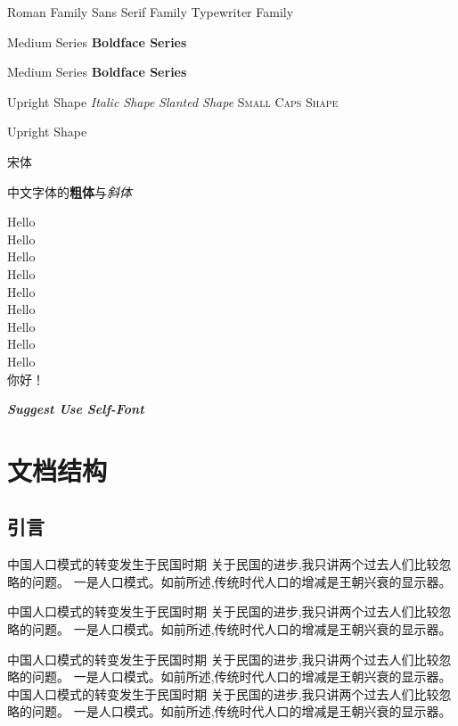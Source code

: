 \documentclass{article} %
\newcommand{\myfont}{\itshape\bfseries\sffamily} %
\begin{document}
	\rmfamily Roman Family {\sffamily Sans Serif Family} {\ttfamily Typewriter Family} 

	
	\textmd{Medium Series} \textbf{Boldface Series}
	
	{\mdseries Medium Series} {\bfseries Boldface Series}
	
	\textup{Upright Shape} \quad \textit{Italic Shape} \quad \textsl{Slanted Shape} \quad \textsc{Small Caps Shape}
	
	{\upshape Upright Shape}   
	
	
	
	{\songti 宋体}    
	
	中文字体的\textbf{粗体}与\textit{斜体}

	{\tiny  Hello}\\
	{\scriptsize  Hello}\\
	{\footnotesize  Hello}\\
	{\small  Hello}\\
	{\normalsize  Hello}\\
	{\large  Hello}\\
	{\LARGE  Hello}\\
	{\huge  Hello}\\
	{\Huge  Hello}\\
	
	{ 你好！} %
	
	
	
	{\myfont Suggest Use Self-Font}
	
	
	\section{文档结构}
	\subsection{引言}
	中国人口模式的转变发生于民国时期 关于民国的进步,我只讲两个过去人们比较忽略的问题。	一是人口模式。如前所述,传统时代人口的增减是王朝兴衰的显示器。
	
	中国人口模式的转变发生于民国时期 关于民国的进步,我只讲两个过去人们比较忽略的问题。	一是人口模式。如前所述,传统时代人口的增减是王朝兴衰的显示器。\par
	中国人口模式的转变发生于民国时期 关于民国的进步,我只讲两个过去人们比较忽略的问题。	一是人口模式。如前所述,传统时代人口的增减是王朝兴衰的显示器。\\中国人口模式的转变发生于民国时期 关于民国的进步,我只讲两个过去人们比较忽略的问题。	一是人口模式。如前所述,传统时代人口的增减是王朝兴衰的显示器。
\end{document}
